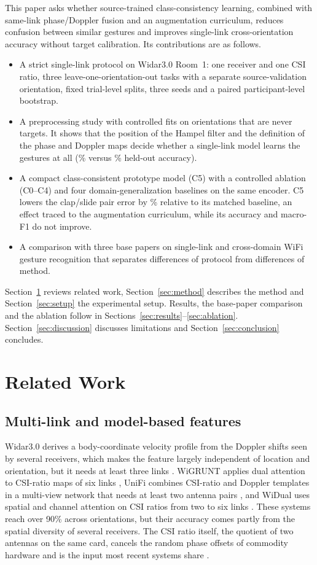 \documentclass[conference]{IEEEtran}
\begin{document}
This paper asks whether source-trained class-consistency learning, combined with same-link phase/Doppler fusion and an augmentation curriculum, reduces confusion between similar gestures and improves single-link cross-orientation accuracy without target calibration. Its contributions are as follows.
\begin{itemize}
\item A strict single-link protocol on Widar3.0 Room~1: one receiver and one CSI ratio, three leave-one-orientation-out tasks with a separate source-validation orientation, fixed trial-level splits, three seeds and a paired participant-level bootstrap.
\item A preprocessing study with \GateNfits{} controlled fits on orientations that are never targets. It shows that the position of the Hampel filter and the definition of the phase and Doppler maps decide whether a single-link model learns the gestures at all (\GateOrig\% versus \GateLocked\% held-out accuracy).
\item A compact class-consistent prototype model (C5) with a controlled ablation (C0--C4) and four domain-generalization baselines on the same encoder. C5 lowers the clap/slide pair error by \CSRelReduction\% relative to its matched baseline, an effect traced to the augmentation curriculum, while its accuracy and macro-F1 do not improve.
\item A comparison with three base papers on single-link and cross-domain WiFi gesture recognition that separates differences of protocol from differences of method.
\end{itemize}
Section~\ref{sec:related} reviews related work, Section~\ref{sec:method} describes the method and Section~\ref{sec:setup} the experimental setup. Results, the base-paper comparison and the ablation follow in Sections~\ref{sec:results}--\ref{sec:ablation}. Section~\ref{sec:discussion} discusses limitations and Section~\ref{sec:conclusion} concludes.

\section{Related Work}\label{sec:related}
\subsection{Multi-link and model-based features}
Widar3.0 derives a body-coordinate velocity profile from the Doppler shifts seen by several receivers, which makes the feature largely independent of location and orientation, but it needs at least three links \cite{zhang2022widar3}. WiGRUNT applies dual attention to CSI-ratio maps of six links \cite{gu2022wigrunt}, UniFi combines CSI-ratio and Doppler templates in a multi-view network that needs at least two antenna pairs \cite{liu2023unifi}, and WiDual uses spatial and channel attention on CSI ratios from two to six links \cite{cao2025widual}. These systems reach over 90\% across orientations, but their accuracy comes partly from the spatial diversity of several receivers. The CSI ratio itself, the quotient of two antennas on the same card, cancels the random phase offsets of commodity hardware and is the input most recent systems share \cite{zeng2019farsense}.
\end{document}
